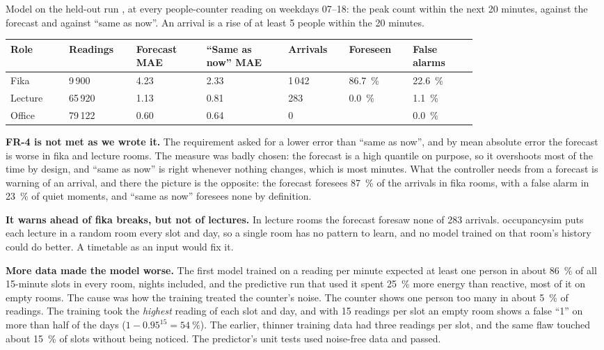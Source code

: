 Model  on the held-out run ,
at every people-counter reading on weekdays 07--18: the peak count within the
next 20 minutes, against the forecast and against ``same as now''. An arrival
is a rise of at least 5 people within the 20 minutes.

\begin{longtable}[]{@{}L{0.10\linewidth}L{0.11\linewidth}L{0.12\linewidth}L{0.14\linewidth}L{0.10\linewidth}L{0.10\linewidth}L{0.11\linewidth}@{}}
\toprule
\textbf{Role} & \textbf{Readings} & \textbf{Forecast MAE} & \textbf{``Same as now'' MAE} & \textbf{Arrivals} & \textbf{Foreseen} & \textbf{False alarms} \\
\midrule
\endhead
Fika & 9\,900 & 4.23 & 2.33 & 1\,042 & 86.7~\% & 22.6~\% \\
Lecture & 65\,920 & 1.13 & 0.81 & 283 & 0.0~\% & 1.1~\% \\
Office & 79\,122 & 0.60 & 0.64 & 0 & & 0.0~\% \\
\bottomrule
\end{longtable}

\textbf{FR-4 is not met as we wrote it.} The requirement asked for a lower
error than ``same as now'', and by mean absolute error the forecast is worse
in fika and lecture rooms. The measure was badly chosen: the forecast is a high
quantile on purpose, so it overshoots most of the time by design, and ``same as
now'' is right whenever nothing changes, which is most minutes. What the
controller needs from a forecast is warning of an arrival, and there the
picture is the opposite: the forecast foresees 87~\% of the arrivals in fika
rooms, with a false alarm in 23~\% of quiet moments, and ``same as now''
foresees none by definition.

\textbf{It warns ahead of fika breaks, but not of lectures.} In lecture rooms
the forecast foresaw none of 283 arrivals. occupancysim puts each lecture in a
random room every slot and day, so a single room has no pattern to learn, and
no model trained on that room's history could do better. A timetable as an
input would fix it.

\textbf{More data made the model worse.} The first model trained on a reading
per minute expected at least one person in about 86~\% of all 15-minute slots
in every room, nights included, and the predictive run that used it spent
25~\% more energy than reactive, most of it on empty rooms. The cause was how
the training treated the counter's noise. The counter shows one person too many
in about 5~\% of readings. The training took the \emph{highest} reading of each
slot and day, and with 15 readings per slot an empty room shows a false ``1''
on more than half of the days ($1 - 0.95^{15} = 54~\%$). The earlier, thinner
training data had three readings per slot, and the same flaw touched about
15~\% of slots without being noticed. The predictor's unit tests used
noise-free data and passed.

